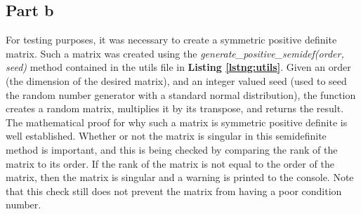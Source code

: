 \documentclass[11pt]{amsart}
\begin{document}
\subsection*{Part b}
For testing purposes, it was necessary to create a symmetric positive definite matrix. Such a matrix was created using the \textit{generate\_positive\_semidef(order, seed)} method contained in the utils file in \textbf{Listing \ref{lstng:utils}}. Given an order (the dimension of the desired matrix), and an integer valued seed (used to seed the random number generator with a standard normal distribution), the function creates a random matrix, multiplies it by its transpose, and returns the result. The mathematical proof for why such a matrix is symmetric positive definite is well established. Whether or not the matrix is singular in this semidefinite method is important, and this is being checked by comparing the rank of the matrix to its order. If the rank of the matrix is not equal to the order of the matrix, then the matrix is singular and a warning is printed to the console. Note that this check still does not prevent the matrix from having a poor condition number. 
\end{document}
